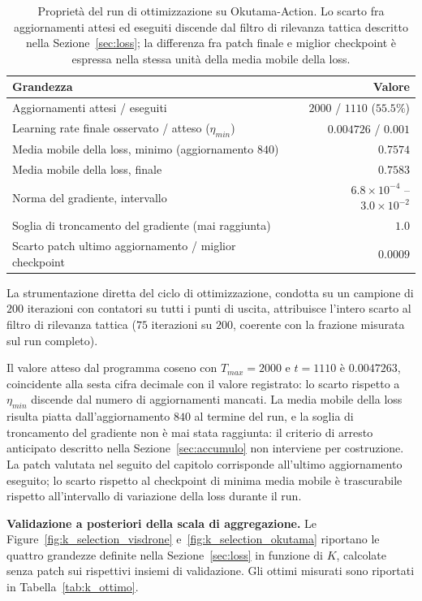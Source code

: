 \documentclass[a4paper,12pt]{report}
\begin{document}
\begin{table}[t]
\centering
\begin{tabular}{lr}
\toprule
Grandezza & Valore \\
\midrule
Aggiornamenti attesi / eseguiti & $2000$ / $1110$ ($55.5\%$) \\
Learning rate finale osservato / atteso ($\eta_{min}$) & $0.004726$ / $0.001$ \\
Media mobile della loss, minimo (aggiornamento $840$) & $0.7574$ \\
Media mobile della loss, finale & $0.7583$ \\
Norma del gradiente, intervallo & $6.8\times10^{-4}$ -- $3.0\times10^{-2}$ \\
Soglia di troncamento del gradiente (mai raggiunta) & $1.0$ \\
Scarto patch ultimo aggiornamento / miglior checkpoint & $0.0009$ \\
\bottomrule
\end{tabular}
\caption{Proprietà del run di ottimizzazione su Okutama-Action. Lo scarto fra aggiornamenti attesi ed eseguiti discende dal filtro di rilevanza tattica descritto nella Sezione~\ref{sec:loss}; la differenza fra patch finale e miglior checkpoint è espressa nella stessa unità della media mobile della loss.}
\label{tab:budget_okutama}
\end{table}

La strumentazione diretta del ciclo di ottimizzazione, condotta su un campione di $200$ iterazioni con contatori su tutti i punti di uscita, attribuisce l'intero scarto al filtro di rilevanza tattica ($75$ iterazioni su $200$, coerente con la frazione misurata sul run completo).

Il valore atteso dal programma coseno con $T_{max}=2000$ e $t=1110$ è $0.0047263$, coincidente alla sesta cifra decimale con il valore registrato: lo scarto rispetto a $\eta_{min}$ discende dal numero di aggiornamenti mancati. La media mobile della loss risulta piatta dall'aggiornamento $840$ al termine del run, e la soglia di troncamento del gradiente non è mai stata raggiunta: il criterio di arresto anticipato descritto nella Sezione~\ref{sec:accumulo} non interviene per costruzione. La patch valutata nel seguito del capitolo corrisponde all'ultimo aggiornamento eseguito; lo scarto rispetto al checkpoint di minima media mobile è trascurabile rispetto all'intervallo di variazione della loss durante il run.

\textbf{Validazione a posteriori della scala di aggregazione.}
\label{sec:risultati_topk}
Le Figure~\ref{fig:k_selection_visdrone} e~\ref{fig:k_selection_okutama} riportano le quattro grandezze definite nella Sezione~\ref{sec:loss} in funzione di $K$, calcolate senza patch sui rispettivi insiemi di validazione. Gli ottimi misurati sono riportati in Tabella~\ref{tab:k_ottimo}.
\end{document}
